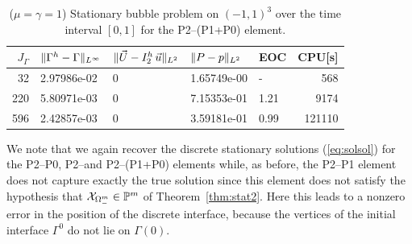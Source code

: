 \begin{table}
\center
\begin{tabular}{rllllr}
\hline
$J_\Gamma$ & $\|\Gamma^h - \Gamma\|_{L^\infty}$ & $\|\vec U - I^h_{2}\,\vec u\|_{L^2}$ & $\|P - p\|_{L^2}$ & EOC & CPU[s] \\
\hline
 32 & 2.97986e-02 & 0 & 1.65749e-00 &    - &    568 \\
220 & 5.80971e-03 & 0 & 7.15353e-01 & 1.21 &   9174 \\
596 & 2.42857e-03 & 0 & 3.59181e-01 & 0.99 & 121110 \\
\hline
\end{tabular}
\caption[Stokes 3d stationary bubble errors P2--(P1+P0)]
{($\mu=\gamma=1$) Stationary bubble problem on $(-1,1)^3$ over the time
interval $[0,1]$ for the P2--(P1+P0) element.}
\label{tab:stokes_stationary_3d_p2p1p0}
\end{table}

We note that we again recover the discrete stationary solutions
(\ref{eq:solsol}) for the P2--P0, P2--\pdg and P2--(P1+P0) elements while,
as before, the P2--P1 element does not capture exactly the true solution
since this element does not satisfy the hypothesis that
$\mathrm{\mathcal{X}}_{\Omega^m_-}\in\mathbb{P}^m$ of Theorem~\ref{thm:stat2}. Here this leads
to a nonzero error in the position of the discrete interface, because the
vertices of the initial interface $\Gamma^0$ do not lie on $\Gamma(0)$.

